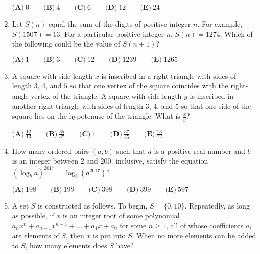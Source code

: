 \documentclass{article}
\begin{document}
\begin{enumerate}[label=\arabic*., itemsep=0.5em]
\(\textbf{(A)}\ 0 \qquad\textbf{(B)}\ 4 \qquad\textbf{(C)}\ 6 \qquad\textbf{(D)}\ 12 \qquad\textbf{(E)}\ 24\)\par \vspace{0.5em}\item Let \(S(n)\) equal the sum of the digits of positive integer \(n\). For example, \(S(1507) = 13\). For a particular positive integer \(n\), \(S(n) = 1274\). Which of the following could be the value of \(S(n+1)\)?

\(\textbf{(A)}\ 1 \qquad\textbf{(B)}\ 3\qquad\textbf{(C)}\ 12\qquad\textbf{(D)}\ 1239\qquad\textbf{(E)}\ 1265\)\par \vspace{0.5em}\item A square with side length \(x\) is inscribed in a right triangle with sides of length \(3\), \(4\), and \(5\) so that one vertex of the square coincides with the right-angle vertex of the triangle. A square with side length \(y\) is inscribed in another right triangle with sides of length \(3\), \(4\), and \(5\) so that one side of the square lies on the hypotenuse of the triangle. What is \(\tfrac{x}{y}\)?

\(\textbf{(A)}\ \frac{12}{13} \qquad \textbf{(B)}\ \frac{35}{37} \qquad\textbf{(C)}\ 1 \qquad\textbf{(D)}\ \frac{37}{35} \qquad\textbf{(E)}\ \frac{13}{12}\)\par \vspace{0.5em}\item How many ordered pairs \((a,b)\) such that \(a\) is a positive real number and \(b\) is an integer between \(2\) and \(200\), inclusive, satisfy the equation \((\log_b a)^{2017}=\log_b(a^{2017})?\)

\(\textbf{(A)}\ 198\qquad\textbf{(B)}\ 199\qquad\textbf{(C)}\ 398\qquad\textbf{(D)}\ 399\qquad\textbf{(E)}\ 597\)\par \vspace{0.5em}\item A set \(S\) is constructed as follows. To begin, \(S = \{0,10\}\). Repeatedly, as long as possible, if \(x\) is an integer root of some polynomial \(a_{n}x^n + a_{n-1}x^{n-1} + ... + a_{1}x + a_0\) for some \(n\geq{1}\), all of whose coefficients \(a_i\) are elements of \(S\), then \(x\) is put into \(S\). When no more elements can be added to \(S\), how many elements does \(S\) have?


\end{enumerate}
\end{document}
